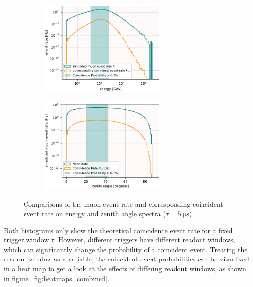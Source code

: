 \begin{figure}[ht]
    \centering
    \begin{subfigure}[b]{\textwidth}
        \centering
        \includegraphics[width=0.7\textwidth]{Plots/coincidence_rate_energy.pdf}
    \end{subfigure}
    \vspace{1em} %
    \begin{subfigure}[b]{\textwidth}
        \centering
        \includegraphics[width=0.7\textwidth]{Plots/coincidence_rate_zenith.pdf}
    \end{subfigure}
    \caption{Comparisons of the muon event rate and corresponding coincident event rate on energy and zenith angle spectra ($\tau = \SI{5}{\micro\second}$)}
    \label{fig:coin_rate_combined}
\end{figure}


Both histograms only show the theoretical coincidence event rate for a fixed trigger window $\tau$. However, different triggers have different readout windows, which 
can significantly change the probability of a coincident event. Treating the readout window as a variable, the coincident event probabilities can be visualized in 
a heat map to get a look at the effects of differing readout windows, as shown in figure~\ref{fig:heatmaps_combined}.

